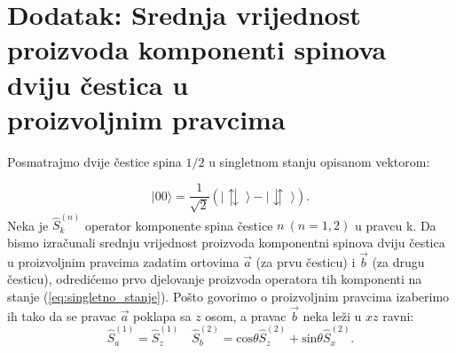 \appendix
\chapter*{Dodatak: Srednja vrijednost proizvoda komponenti spinova dviju \v cestica u \\ proizvoljnim pravcima}
\setcounter{chapter}{4} \setcounter{equation}{0}

Posmatrajmo dvije čestice spina $1/2$ u singletnom stanju opisanom vektorom:

\begin{equation}
    | 00 \rangle = \frac{1}{\sqrt2}(| \updownarrows \; \rangle - | \downuparrows \; \rangle) \label{eq:singletno_stanje}.
\end{equation}
Neka je $\hat{S}_k^{(n)}$ operator komponente spina čestice $n \ (n = 1, 2)$ u pravcu k. Da bismo izračunali srednju vrijednost proizvoda komponentni spinova dviju čestica u proizvoljnim pravcima zadatim ortovima $\vec{a}$ (za prvu česticu) i $\vec{b}$ (za drugu česticu), odredićemo prvo djelovanje proizvoda operatora tih komponenti na stanje (\ref{eq:singletno_stanje}).
Pošto govorimo o proizvoljnim pravcima izaberimo ih tako da se pravac $\vec{a}$ poklapa sa $z$ osom, a pravac $\vec{b}$ neka leži u $xz$ ravni:
\begin{equation*}
    \hat{S}_a^{(1)} = \hat{S}_z^{(1)} \quad \hat{S}_b^{(2)} = \mathrm{cos}{\theta} \hat{S}_z^{(2)} + \mathrm{sin}{\theta} \hat{S}_x^{(2)}.
\end{equation*}



